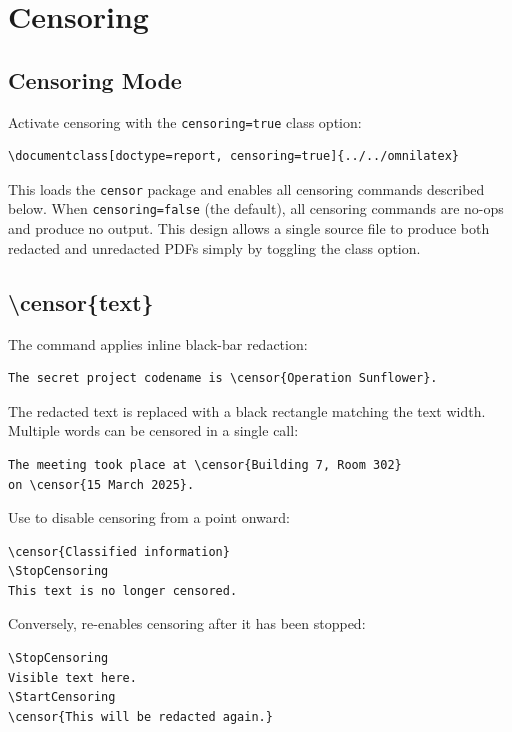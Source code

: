 \chapter{Censoring}
\label{ch:censoring}

\section{Censoring Mode}

Activate censoring with the \texttt{censoring=true} class option:

\begin{verbatim}
\documentclass[doctype=report, censoring=true]{../../omnilatex}
\end{verbatim}

This loads the \texttt{censor} package and enables all censoring commands
described below.  When \texttt{censoring=false} (the default), all censoring
commands are no-ops and produce no output.  This design allows a single
source file to produce both redacted and unredacted PDFs simply by toggling
the class option.

\section{\textbackslash censor\{text\}}

The  command applies inline black-bar redaction:

\begin{verbatim}
The secret project codename is \censor{Operation Sunflower}.
\end{verbatim}

The redacted text is replaced with a black rectangle matching the text width.
Multiple words can be censored in a single call:

\begin{verbatim}
The meeting took place at \censor{Building 7, Room 302}
on \censor{15 March 2025}.
\end{verbatim}

Use  to disable censoring from a point onward:

\begin{verbatim}
\censor{Classified information}
\StopCensoring
This text is no longer censored.
\end{verbatim}

Conversely,  re-enables censoring after it has been
stopped:

\begin{verbatim}
\StopCensoring
Visible text here.
\StartCensoring
\censor{This will be redacted again.}
\end{verbatim}

